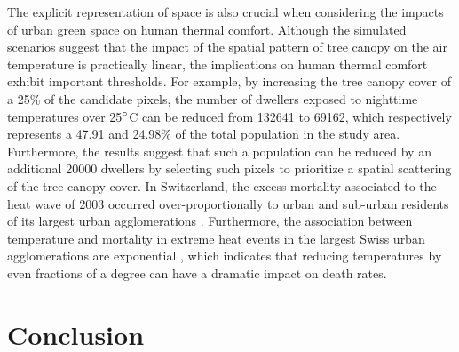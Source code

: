 \documentclass[10pt,letterpaper]{article}
\begin{document}
The explicit representation of space is also crucial when considering the impacts of urban green space on human thermal comfort.
Although the simulated scenarios suggest that the impact of the spatial pattern of tree canopy on the air temperature is practically linear, the implications on human thermal comfort exhibit important thresholds.
For example, by increasing the tree canopy cover of a 25\% of the candidate pixels, the number of dwellers exposed to nighttime temperatures over 25$\degree$C can be reduced from 132641 to 69162, which respectively represents a 47.91 and 24.98\% of the total population in the study area.
Furthermore, the results suggest that such a population can be reduced by an additional 20000 dwellers by selecting such pixels to prioritize a spatial scattering of the tree canopy cover.
In Switzerland, the excess mortality associated to the heat wave of 2003 occurred over-proportionally to urban and sub-urban residents of its largest urban agglomerations \cite{grize2005heat}.
Furthermore, the association between temperature and mortality in extreme heat events in the largest Swiss urban agglomerations are exponential \cite{ragettli2017exploring}, which indicates that reducing temperatures by even fractions of a degree can have a dramatic impact on death rates.



\section*{Conclusion}
\end{document}
